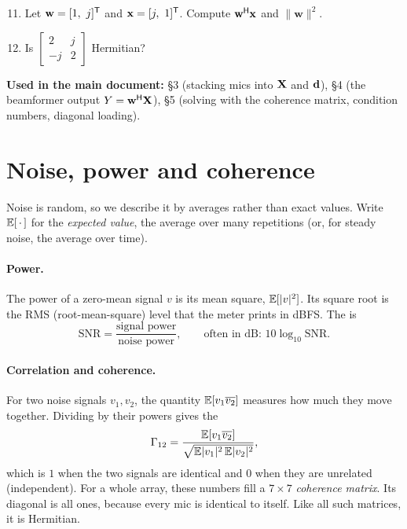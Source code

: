 \documentclass[11pt]{article}
\begin{document}
\begin{checkyourself}
\begin{enumerate}[nosep]
\setcounter{enumi}{10}
\item Let $\mathbf w=[1,\ j]^{\mathsf T}$ and $\mathbf x=[j,\ 1]^{\mathsf T}$. Compute $\mathbf w^{\mathsf H}\mathbf x$
  and $\|\mathbf w\|^2$.
\item Is $\begin{bmatrix}2 & j\\ -j & 2\end{bmatrix}$ Hermitian?
\end{enumerate}
\end{checkyourself}

\begin{whereused}
\textbf{Used in the main document:} \S3 (stacking mics into $\mathbf{X}$ and $\mathbf{d}$), \S4 (the
beamformer output $Y=\mathbf{w}^{\mathsf H}\mathbf{X}$), \S5 (solving with the coherence matrix, condition numbers,
diagonal loading).
\end{whereused}

\section{Noise, power and coherence}\label{sec:prob}

Noise is random, so we describe it by averages rather than exact values. Write $\mathbb{E}[\,\cdot\,]$
for the \emph{expected value}, the average over many repetitions (or, for steady noise, the
average over time).

\paragraph{Power.} The power of a zero-mean signal $v$ is its mean square, $\mathbb{E}[|v|^2]$. Its square
root is the RMS (root-mean-square) level that the  meter prints in dBFS. The
 is
\[
  \text{SNR}=\frac{\text{signal power}}{\text{noise power}},\qquad\text{often in dB: }10\log_{10}\text{SNR}.
\]

\paragraph{Correlation and coherence.} For two noise signals $v_1,v_2$, the quantity
$\mathbb{E}[v_1\overline{v_2}]$ measures how much they move together. Dividing by their powers gives the
\[
  \Gamma_{12}=\frac{\mathbb{E}[v_1\overline{v_2}]}{\sqrt{\mathbb{E}|v_1|^2\,\mathbb{E}|v_2|^2}},
\]
which is $1$ when the two signals are identical and $0$ when they are unrelated (independent).
For a whole array, these numbers fill a $7\times7$ \emph{coherence matrix}. Its diagonal is all
ones, because every mic is identical to itself. Like all such matrices, it is Hermitian.
\end{document}
